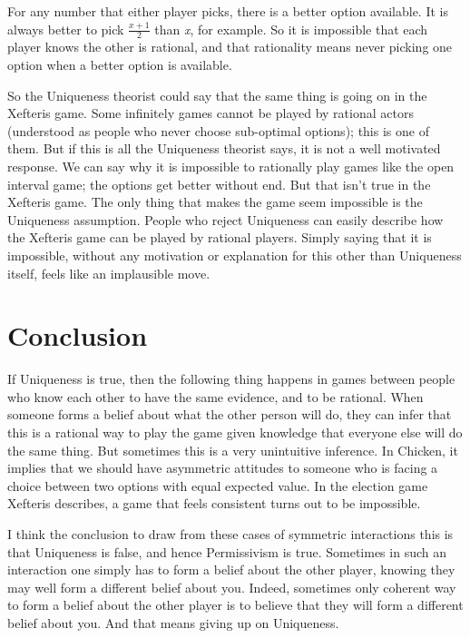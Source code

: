 \documentclass[
  12pt,
  letterpaper,
  DIV=11,
  numbers=noendperiod]{scrreprt}
\begin{document}
For any number that either player picks, there is a better option
available. It is always better to pick \(\frac{x+1}{2}\) than \emph{x},
for example. So it is impossible that each player knows the other is
rational, and that rationality means never picking one option when a
better option is available.

So the Uniqueness theorist could say that the same thing is going on in
the Xefteris game. Some infinitely games cannot be played by rational
actors (understood as people who never choose sub-optimal options); this
is one of them. But if this is all the Uniqueness theorist says, it is
not a well motivated response. We can say why it is impossible to
rationally play games like the open interval game; the options get
better without end. But that isn't true in the Xefteris game. The only
thing that makes the game seem impossible is the Uniqueness assumption.
People who reject Uniqueness can easily describe how the Xefteris game
can be played by rational players. Simply saying that it is impossible,
without any motivation or explanation for this other than Uniqueness
itself, feels like an implausible move.

\hypertarget{conclusion}{%
\section{Conclusion}\label{conclusion}}

If Uniqueness is true, then the following thing happens in games between
people who know each other to have the same evidence, and to be
rational. When someone forms a belief about what the other person will
do, they can infer that this is a rational way to play the game given
knowledge that everyone else will do the same thing. But sometimes this
is a very unintuitive inference. In Chicken, it implies that we should
have asymmetric attitudes to someone who is facing a choice between two
options with equal expected value. In the election game Xefteris
describes, a game that feels consistent turns out to be impossible.

I think the conclusion to draw from these cases of symmetric
interactions this is that Uniqueness is false, and hence Permissivism is
true. Sometimes in such an interaction one simply has to form a belief
about the other player, knowing they may well form a different belief
about you. Indeed, sometimes only coherent way to form a belief about
the other player is to believe that they will form a different belief
about you. And that means giving up on Uniqueness.
\end{document}
